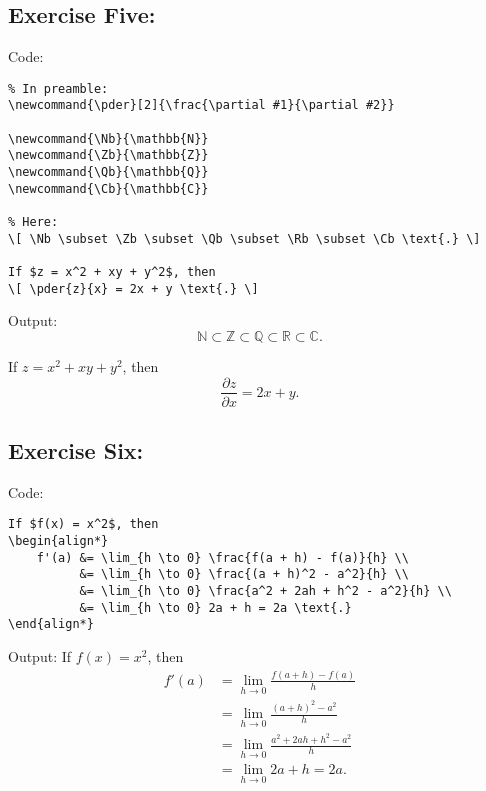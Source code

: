 \documentclass{article} %
\newcommand{\pder}[2]{\frac{\partial #1}{\partial #2}}
\newcommand{\Rb}{\mathbb{R}}
\newcommand{\Nb}{\mathbb{N}}
\newcommand{\Zb}{\mathbb{Z}}
\newcommand{\Qb}{\mathbb{Q}}
\newcommand{\Cb}{\mathbb{C}}
\begin{document}
\subsection*{Exercise Five:}
Code:
\begin{verbatim}
% In preamble:
\newcommand{\pder}[2]{\frac{\partial #1}{\partial #2}}

\newcommand{\Nb}{\mathbb{N}}
\newcommand{\Zb}{\mathbb{Z}}
\newcommand{\Qb}{\mathbb{Q}}
\newcommand{\Cb}{\mathbb{C}}

% Here:
\[ \Nb \subset \Zb \subset \Qb \subset \Rb \subset \Cb \text{.} \]

If $z = x^2 + xy + y^2$, then
\[ \pder{z}{x} = 2x + y \text{.} \]
\end{verbatim}

Output:
\[ \Nb \subset \Zb \subset \Qb \subset \Rb \subset \Cb \text{.} \]

If $z = x^2 + xy + y^2$, then
\[ \pder{z}{x} = 2x + y \text{.} \]

\subsection*{Exercise Six:}
Code:
\begin{verbatim}
If $f(x) = x^2$, then
\begin{align*}
	f'(a) &= \lim_{h \to 0} \frac{f(a + h) - f(a)}{h} \\
		  &= \lim_{h \to 0} \frac{(a + h)^2 - a^2}{h} \\
		  &= \lim_{h \to 0} \frac{a^2 + 2ah + h^2 - a^2}{h} \\
		  &= \lim_{h \to 0} 2a + h = 2a \text{.}
\end{align*}
\end{verbatim}
Output: If $f(x) = x^2$, then
\begin{align*}
	f'(a) &= \lim_{h \to 0} \frac{f(a + h) - f(a)}{h} \\
	&= \lim_{h \to 0} \frac{(a + h)^2 - a^2}{h} \\
	&= \lim_{h \to 0} \frac{a^2 + 2ah + h^2 - a^2}{h} \\
	&= \lim_{h \to 0} 2a + h = 2a \text{.}
\end{align*}
\end{document}

